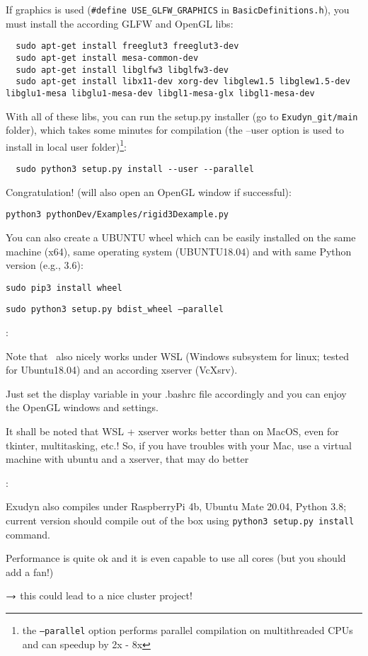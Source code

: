 \noindent 
If graphics is used (\texttt{\#define USE\_GLFW\_GRAPHICS} in \texttt{BasicDefinitions.h}), you must install the according GLFW and OpenGL libs:
\begin{lstlisting}
  sudo apt-get install freeglut3 freeglut3-dev
  sudo apt-get install mesa-common-dev
  sudo apt-get install libglfw3 libglfw3-dev
  sudo apt-get install libx11-dev xorg-dev libglew1.5 libglew1.5-dev libglu1-mesa libglu1-mesa-dev libgl1-mesa-glx libgl1-mesa-dev
\end{lstlisting}

\noindent 
With all of these libs, you can run the setup.py installer (go to \texttt{Exudyn\_git/main} folder), which takes some minutes for compilation (the --user option is used to install in local user folder)\footnote{the \texttt{--parallel} option performs parallel compilation on multithreaded CPUs and can speedup by 2x - 8x}:
\begin{lstlisting}
  sudo python3 setup.py install --user --parallel
\end{lstlisting}

\noindent 
Congratulation!  (will also open an OpenGL window if successful):
\bi
  \item[] \texttt{python3 pythonDev/Examples/rigid3Dexample.py}
\ei

\noindent You can also create a UBUNTU wheel which can be easily installed on the same machine (x64), same operating system (UBUNTU18.04) and with same Python version (e.g., 3.6):
\bi
  \item[] \texttt{sudo pip3 install wheel}
  \item[] \texttt{sudo python3 setup.py bdist\_wheel --parallel}
\ei

\noindent {}:
\bi
  \item Note that \codeName\ also nicely works under WSL (Windows subsystem for linux; tested for Ubuntu18.04) and an according xserver (VcXsrv).
  \item Just set the display variable in your .bashrc file accordingly and you can enjoy the OpenGL windows and settings.
  \item It shall be noted that WSL + xserver works better than on MacOS, even for tkinter, multitasking, etc.! So, if you have troubles with your Mac, use a virtual machine with ubuntu and a xserver, that may do better
\ei

\noindent {}:
\bi
  \item Exudyn also compiles under RaspberryPi 4b, Ubuntu Mate 20.04, Python 3.8; current version should compile out of the box using \texttt{python3 setup.py install} command.
  \item Performance is quite ok and it is even capable to use all cores (but you should add a fan!)
  \item $\rightarrow$ this could lead to a nice cluster project!
\ei


